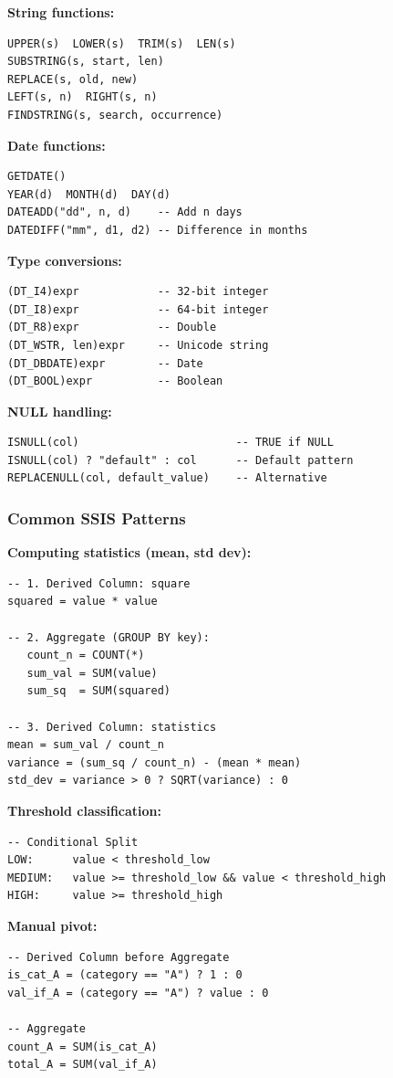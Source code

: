 \textbf{String functions:}
\begin{lstlisting}
UPPER(s)  LOWER(s)  TRIM(s)  LEN(s)
SUBSTRING(s, start, len)
REPLACE(s, old, new)
LEFT(s, n)  RIGHT(s, n)
FINDSTRING(s, search, occurrence)
\end{lstlisting}

\textbf{Date functions:}
\begin{lstlisting}
GETDATE()
YEAR(d)  MONTH(d)  DAY(d)
DATEADD("dd", n, d)    -- Add n days
DATEDIFF("mm", d1, d2) -- Difference in months
\end{lstlisting}

\textbf{Type conversions:}
\begin{lstlisting}
(DT_I4)expr            -- 32-bit integer
(DT_I8)expr            -- 64-bit integer
(DT_R8)expr            -- Double
(DT_WSTR, len)expr     -- Unicode string
(DT_DBDATE)expr        -- Date
(DT_BOOL)expr          -- Boolean
\end{lstlisting}

\textbf{NULL handling:}
\begin{lstlisting}
ISNULL(col)                        -- TRUE if NULL
ISNULL(col) ? "default" : col      -- Default pattern
REPLACENULL(col, default_value)    -- Alternative
\end{lstlisting}

\subsubsection{Common SSIS Patterns}
\label{subsec:ssis-common-patterns}

\textbf{Computing statistics (mean, std dev):}
\begin{lstlisting}
-- 1. Derived Column: square
squared = value * value

-- 2. Aggregate (GROUP BY key):
   count_n = COUNT(*)
   sum_val = SUM(value)
   sum_sq  = SUM(squared)

-- 3. Derived Column: statistics
mean = sum_val / count_n
variance = (sum_sq / count_n) - (mean * mean)
std_dev = variance > 0 ? SQRT(variance) : 0
\end{lstlisting}

\textbf{Threshold classification:}
\begin{lstlisting}
-- Conditional Split
LOW:      value < threshold_low
MEDIUM:   value >= threshold_low && value < threshold_high
HIGH:     value >= threshold_high
\end{lstlisting}

\textbf{Manual pivot:}
\begin{lstlisting}
-- Derived Column before Aggregate
is_cat_A = (category == "A") ? 1 : 0
val_if_A = (category == "A") ? value : 0

-- Aggregate
count_A = SUM(is_cat_A)
total_A = SUM(val_if_A)
\end{lstlisting}
